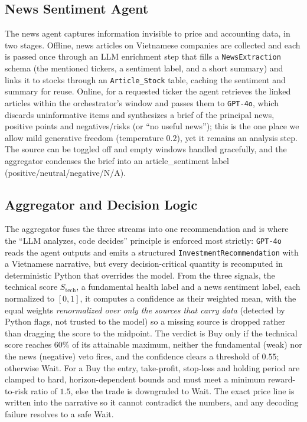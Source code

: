 \documentclass[runningheads]{llncs}
\begin{document}
\subsection{News Sentiment Agent}
\label{sec:news}

The news agent captures information invisible to price and accounting data, in two
stages. Offline, news articles on Vietnamese companies are collected and each is
passed once through an LLM enrichment step that fills a \texttt{NewsExtraction}
schema (the mentioned tickers, a sentiment label, and a short summary) and links
it to stocks through an \texttt{Article\_Stock} table, caching the sentiment and
summary for reuse. Online, for a requested ticker the agent retrieves the linked
articles within the orchestrator's window and passes them to \texttt{GPT-4o},
which discards uninformative items and synthesizes a brief of the principal news,
positive points and negatives/risks (or ``no useful news''); this is the one place
we allow mild generative freedom (temperature $0.2$), yet it remains an analysis
step. The source can be toggled off and empty windows handled gracefully, and the
aggregator condenses the brief into an \textsf{article\_sentiment} label
(positive/neutral/negative/N/A).

\subsection{Aggregator and Decision Logic}
\label{sec:aggregator}

The aggregator fuses the three streams into one recommendation and is where the
``LLM analyzes, code decides'' principle is enforced most strictly:
\texttt{GPT-4o} reads the agent outputs and emits a structured
\texttt{InvestmentRecommendation} with a Vietnamese narrative, but every
decision-critical quantity is recomputed in deterministic Python that overrides
the model. From the three signals, the technical score $S_{\mathrm{tech}}$, a
fundamental health label and a news sentiment label, each normalized to $[0,1]$,
it computes a confidence as their weighted mean, with the equal weights
\emph{renormalized over only the sources that carry data} (detected by Python
flags, not trusted to the model) so a missing source is dropped rather than
dragging the score to the midpoint. The verdict is \textsf{Buy} only if the
technical score reaches $60\%$ of its attainable maximum, neither the fundamental
(\textsf{weak}) nor the news (\textsf{negative}) veto fires, and the confidence
clears a threshold of $0.55$; otherwise \textsf{Wait}. For a \textsf{Buy} the
entry, take-profit, stop-loss and holding period are clamped to hard,
horizon-dependent bounds and must meet a minimum reward-to-risk ratio of $1.5$,
else the trade is downgraded to \textsf{Wait}. The exact price line is written into
the narrative so it cannot contradict the numbers, and any decoding failure
resolves to a safe \textsf{Wait}.
\end{document}
